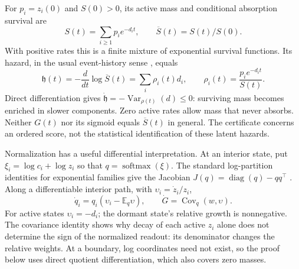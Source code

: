 \documentclass[pdflatex,sn-vancouver-num]{sn-jnl}
\theoremstyle{thmstyleone}
\begin{document}
For $p_i=z_i(0)$ and $S(0)>0$, its active mass and conditional absorption survival are
\begin{equation}\label{eq:active-survival}
S(t)=\sum_{i\ge1}p_i e^{-d_it},\qquad
\overline S(t)=S(t)/S(0).
\end{equation}
With positive rates this is a finite mixture of exponential survival functions. Its hazard, in the usual event-history sense \cite{aalen}, equals
\begin{equation}\label{eq:mixture-hazard}
\mathfrak h(t)=-\frac{d}{dt}\log\overline S(t)
=\sum_i\rho_i(t)d_i,\qquad
\rho_i(t)=\frac{p_i e^{-d_it}}{S(t)}.
\end{equation}
Direct differentiation gives $\dot{\mathfrak h}=-\operatorname{Var}_{\rho(t)}(d)\le0$: surviving mass becomes enriched in slower components. Zero active rates allow mass that never absorbs. Neither $G(t)$ nor its sigmoid equals $\overline S(t)$ in general. The certificate concerns an ordered score, not the statistical identification of these latent hazards.

Normalization has a useful differential interpretation. At an interior state, put $\xi_i=\log c_i+\log z_i$ so that $q=\operatorname{softmax}(\xi)$. The standard log-partition identities for exponential families give the Jacobian $J(q)=\operatorname{diag}(q)-qq^\top$ \cite{exponential}. Along a differentiable interior path, with $\upsilon_i=\dot z_i/z_i$,
\begin{equation}\label{eq:covariance}
\dot q_i=q_i(\upsilon_i-\mathbb E_q\upsilon),\qquad
\dot G=\operatorname{Cov}_q(w,\upsilon).
\end{equation}
For active states $\upsilon_i=-d_i$; the dormant state's relative growth is nonnegative. The covariance identity shows why decay of each active $z_i$ alone does not determine the sign of the normalized readout: its denominator changes the relative weights. At a boundary, log coordinates need not exist, so the proof below uses direct quotient differentiation, which also covers zero masses.
\end{document}
